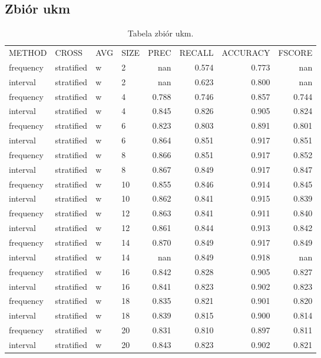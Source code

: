 \subsection{Zbiór ukm}
\begin{table}[H]
\centering
\caption{Tabela zbiór ukm.}
\label{table-ukm}
\begin{tabular}{llllrrrr}
METHOD    & CROSS      & AVG & SIZE & PREC  & RECALL & ACCURACY & FSCORE \\
frequency & stratified & w   & 2    & nan   & 0.574  & 0.773    & nan    \\
interval  & stratified & w   & 2    & nan   & 0.623  & 0.800    & nan    \\
frequency & stratified & w   & 4    & 0.788 & 0.746  & 0.857    & 0.744  \\
interval  & stratified & w   & 4    & 0.845 & 0.826  & 0.905    & 0.824  \\
frequency & stratified & w   & 6    & 0.823 & 0.803  & 0.891    & 0.801  \\
interval  & stratified & w   & 6    & 0.864 & 0.851  & 0.917    & 0.851  \\
frequency & stratified & w   & 8    & 0.866 & 0.851  & 0.917    & 0.852  \\
interval  & stratified & w   & 8    & 0.867 & 0.849  & 0.917    & 0.847  \\
frequency & stratified & w   & 10   & 0.855 & 0.846  & 0.914    & 0.845  \\
interval  & stratified & w   & 10   & 0.862 & 0.841  & 0.915    & 0.839  \\
frequency & stratified & w   & 12   & 0.863 & 0.841  & 0.911    & 0.840  \\
interval  & stratified & w   & 12   & 0.861 & 0.844  & 0.913    & 0.842  \\
frequency & stratified & w   & 14   & 0.870 & 0.849  & 0.917    & 0.849  \\
interval  & stratified & w   & 14   & nan   & 0.849  & 0.918    & nan    \\
frequency & stratified & w   & 16   & 0.842 & 0.828  & 0.905    & 0.827  \\
interval  & stratified & w   & 16   & 0.841 & 0.823  & 0.902    & 0.823  \\
frequency & stratified & w   & 18   & 0.835 & 0.821  & 0.901    & 0.820  \\
interval  & stratified & w   & 18   & 0.839 & 0.815  & 0.900    & 0.814  \\
frequency & stratified & w   & 20   & 0.831 & 0.810  & 0.897    & 0.811  \\
interval  & stratified & w   & 20   & 0.843 & 0.823  & 0.902    & 0.821 
\end{tabular}
\end{table}

